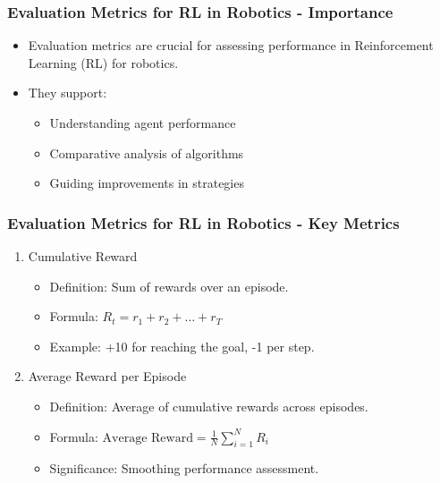 \documentclass{beamer}
\begin{document}
\begin{frame}[fragile]
    \frametitle{Evaluation Metrics for RL in Robotics - Importance}
    \begin{itemize}
        \item Evaluation metrics are crucial for assessing performance in Reinforcement Learning (RL) for robotics.
        \item They support:
        \begin{itemize}
            \item Understanding agent performance
            \item Comparative analysis of algorithms
            \item Guiding improvements in strategies
        \end{itemize}
    \end{itemize}
\end{frame}

\begin{frame}[fragile]
    \frametitle{Evaluation Metrics for RL in Robotics - Key Metrics}
    \begin{enumerate}
        \item Cumulative Reward
        \begin{itemize}
            \item Definition: Sum of rewards over an episode.
            \item Formula: $R_t = r_1 + r_2 + \ldots + r_T$
            \item Example: +10 for reaching the goal, -1 per step.
        \end{itemize}

        \item Average Reward per Episode
        \begin{itemize}
            \item Definition: Average of cumulative rewards across episodes.
            \item Formula: $\text{Average Reward} = \frac{1}{N} \sum_{i=1}^{N} R_i$ 
            \item Significance: Smoothing performance assessment.
        \end{itemize}
    \end{enumerate}
\end{frame}
\end{document}
